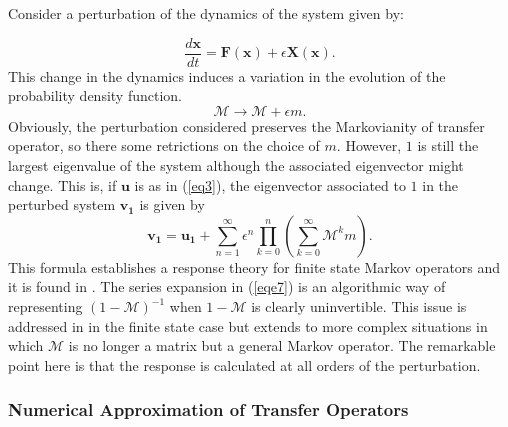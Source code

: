Consider a perturbation of the dynamics of the system given by:

\begin{equation}
\frac{d\mathbf{x}}{dt}=\mathbf{F}(\mathbf{x}) + \epsilon \mathbf{X}(\mathbf{x}).
\end{equation}
This change in the dynamics induces a variation in the evolution of the probability density function. 
\begin{equation}
	\mathcal{M} \longrightarrow \mathcal{M} + \epsilon m.
\end{equation}
Obviously, the perturbation considered preserves the Markovianity of transfer operator, so there some retrictions on the choice of $m$. However, $1$ is still the largest eigenvalue of the system although the associated eigenvector might change. This is, if $\mathbf{u}$ is as in (\ref{eq3}), the eigenvector associated to $1$ in the perturbed system $\mathbf{v_1}$ is given by
\begin{equation}\label{eqe7}
\mathbf{v_1}=\mathbf{u_1} + \sum_{n=1}^{\infty}\epsilon ^{n} \prod _{k=0}^{n}\left( \sum_{k=0}^{\infty}\mathcal{M}^km \right).
\end{equation}
This formula establishes a response theory for finite state Markov operators and it is found in \cite{lucarini}. The series expansion in (\ref{eqe7}) is an algorithmic way of representing $(1-\mathcal{M})^{-1}$ when $1-\mathcal{M}$ is clearly uninvertible. This issue is addressed in \cite{lucarini} in the finite state case but extends to more complex situations in which $\mathcal{M}$ is no longer a matrix but a general Markov operator. The remarkable point here is that the response is calculated at all orders of the perturbation.



\subsubsection{Numerical Approximation of Transfer Operators}

